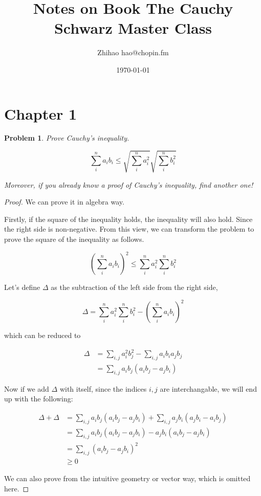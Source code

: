 \documentclass{article}
\title{Notes on Book The Cauchy Schwarz Master Class}
\author{Zhihao hao@chopin.fm}
\date{\today}
\newtheorem{problem}{Problem}[section]
\begin{document}
\maketitle
\section{Chapter 1}

\begin{problem}
    Prove Cauchy's inequality.

    \begin{equation}
        \sum_i^n{a_ib_i} \leq \sqrt{\sum_i^n{a_i^2}}  \sqrt{\sum_i^n{b_i^2}}
    \end{equation}

    Moreover, if you already know a proof of Cauchy's inequality, find another one!

\end{problem}

\begin{proof}
    We can prove it in algebra way.

    Firstly, if the square of the inequality holds, the inequality will also hold. Since the right side is non-negative. From this view, we can transform
    the problem to prove the square of the inequality as follows.

    \begin{equation*}
        (\sum_i^n{a_ib_i})^2 \leq \sum_i^n{a_i^2}  \sum_i^n{b_i^2}
    \end{equation*}

    Let's define $\Delta$ as the subtraction of the left side from the right side,

    \begin{equation*}
        \Delta = \sum_i^n{a_i^2}  \sum_i^n{b_i^2} - (\sum_i^n{a_ib_i})^2
    \end{equation*}

    which can be reduced to

    \begin{align*}
        \Delta & = \sum_{i,j}{a_i^{2}b_j^{2}} - \sum_{i,j}{a_ib_ia_jb_j} \\
               & = \sum_{i,j}{a_ib_j(a_ib_j - a_jb_i)}
    \end{align*}

    Now if we add $\Delta$ with itself, since the indices $i,j$ are interchangable, we will end up with the following:

    \begin{align*}
        \Delta + \Delta & = \sum_{i,j}{a_ib_j(a_ib_j - a_jb_i)} + \sum_{i,j}{a_jb_i(a_jb_i - a_ib_j)} \\
               & = \sum_{i,j}{a_ib_j(a_ib_j - a_jb_i) - a_jb_i(a_ib_j - a_jb_i)} \\
               & = \sum_{i,j}{(a_ib_j - a_jb_i)^2} \\
               & \geq 0
    \end{align*}

    We can also prove from the intuitive geometry or vector way, which is omitted here.
\end{proof}
\end{document}
